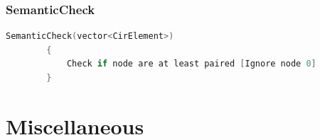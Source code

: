 \documentclass[a4paper, titlepage]{article}
\begin{document}
    \subsubsection{SemanticCheck}
    \begin{lstlisting}[language=C++]
        SemanticCheck(vector<CirElement>)
        {
            Check if node are at least paired [Ignore node 0]
        }
    \end{lstlisting}
    
    \pagebreak
    \section{Miscellaneous}



    \pagebreak
    \printbibliography[title={References}]
\end{document}
